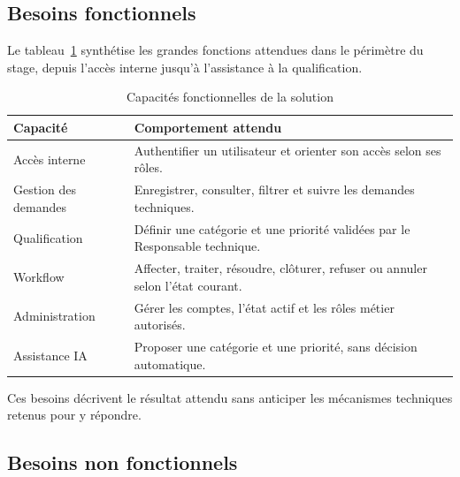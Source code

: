 \subsection{Besoins fonctionnels}
\label{subsec:02-besoins-fonctionnels}

Le tableau~\ref{tab:02-capacites-fonctionnelles} synthétise les grandes fonctions attendues dans le périmètre du stage, depuis l'accès interne jusqu'à l'assistance à la qualification.

\begin{table}[htbp]
\centering
\small
\caption{Capacités fonctionnelles de la solution}
\label{tab:02-capacites-fonctionnelles}
\begingroup
\setlength{\arrayrulewidth}{0.3pt}
\renewcommand{\arraystretch}{1.12}
\newcommand{\FCell}[1]{{\raggedright #1\par}}
\begin{tabular}{@{}p{}p{}@{}}
\hline
\FCell{\textbf{Capacité}} & \FCell{\textbf{Comportement attendu}}\\ \hline
\FCell{Accès interne} & \FCell{Authentifier un utilisateur et orienter son accès selon ses rôles.}\\ \hline
\FCell{Gestion des demandes} & \FCell{Enregistrer, consulter, filtrer et suivre les demandes techniques.}\\ \hline
\FCell{Qualification} & \FCell{Définir une catégorie et une priorité validées par le Responsable technique.}\\ \hline
\FCell{Workflow} & \FCell{Affecter, traiter, résoudre, clôturer, refuser ou annuler selon l'état courant.}\\ \hline
\FCell{Administration} & \FCell{Gérer les comptes, l'état actif et les rôles métier autorisés.}\\ \hline
\FCell{Assistance IA} & \FCell{Proposer une catégorie et une priorité, sans décision automatique.}\\ \hline
\end{tabular}
\endgroup
\end{table}
\FloatBarrier

Ces besoins décrivent le résultat attendu sans anticiper les mécanismes techniques retenus pour y répondre.

\subsection{Besoins non fonctionnels}
\label{subsec:02-besoins-non-fonctionnels}

